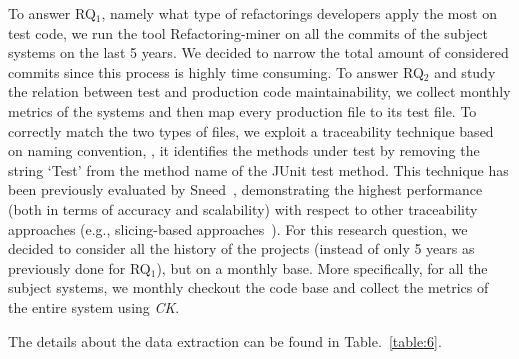 To answer RQ$_1$, namely what type of refactorings developers apply the most on test code, we run the tool Refactoring-miner on all the commits of the subject systems on the last 5 years. We decided to narrow the total amount of considered commits since this process is highly time consuming. 
To answer RQ$_2$ and study the relation between test and production code maintainability, we collect monthly metrics of the systems and then map every production file to its test file. To correctly match the two types of files, we exploit a traceability technique based on naming convention, \ie, it identifies the methods under test by removing the string ‘Test’ from the method name of the JUnit test method. This technique has been previously evaluated by Sneed~\cite{sneed2004reverse}, demonstrating the highest performance (both in terms of accuracy and scalability) with respect to other traceability approaches (e.g., slicing-based approaches~\cite{qusef2014recovering}). 
For this research question, we decided to consider all the history of the projects (instead of only 5 years as previously done for RQ$_1$), but on a monthly base. More specifically, for all the subject systems, we monthly checkout the code base and collect the metrics of the entire system using \emph{CK}. 

The details about the data extraction can be found in Table.~\ref{table:6}.

